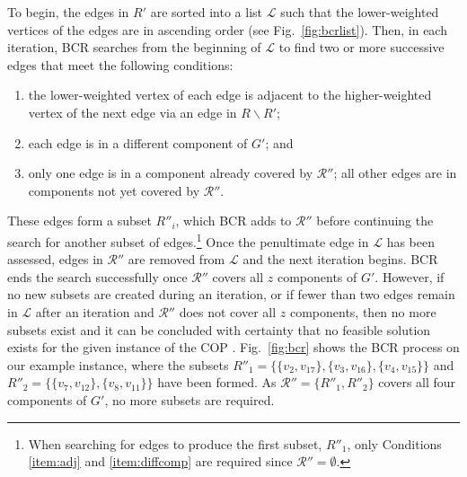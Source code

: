 \documentclass[a4paper,11pt,authoryear]{elsarticle}
\newcommand{\rev}[1]{{\color{myRed}#1}}
\begin{document}
To begin, the edges in $R'$ are sorted into a list $\mathcal{L}$ such that the lower-weighted vertices of the edges are in ascending order (see Fig.~\ref{fig:bcrlist}). Then, in each iteration, BCR searches from the beginning of $\mathcal{L}$ to find two or more successive edges that meet the following conditions:
\begin{enumerate}[label={(\roman*)},itemsep=-0.2em]
	\item the lower-weighted vertex of each edge is adjacent to the higher-weighted vertex of the next edge via an edge in $R\backslash R'$;\label{item:adj}
	\item each edge is in a different component of $G'$; \label{item:diffcomp} and
	\item only one edge is in a component already covered by $\mathcal{R}''$; all other edges are in components not yet covered by $\mathcal{R}''$.\label{item:overlap}
\end{enumerate} 
These edges form a subset $R''_i$, which BCR adds to $\mathcal{R}''$ before continuing the search for another subset of edges.\footnote{When searching for edges to produce the first subset, $R''_1$, only Conditions \ref{item:adj} and \ref{item:diffcomp} are required since $\mathcal{R}'' = \emptyset$.} Once the penultimate edge in $\mathcal{L}$ has been assessed, edges in $\mathcal{R}''$ are removed from $\mathcal{L}$ and the next iteration begins. BCR ends the search successfully once $\mathcal{R}''$ covers all $z$ components of $G'$. However, if no new subsets are created during an iteration, or if fewer than two edges remain in $\mathcal{L}$ after an iteration and $\mathcal{R}''$ does not cover all $z$ components, then no more subsets exist and \rev{it can be concluded with certainty that no feasible solution exists for the given instance of the COP \citep{hawa2020t}.} Fig.~\ref{fig:bcr} shows the BCR process on our example instance, where the subsets $R''_1 = \{\{v_2, v_{17}\},\{v_3, v_{16}\}, \{v_4, v_{15}\}\}$ and $R''_2 = \{\{v_7, v_{12}\}, \{v_8, v_{11}\}\}$ have been formed. As $\mathcal{R}'' =\{R''_1, R''_2\}$ covers all four components of $G'$, no more subsets are required.
\end{document}
